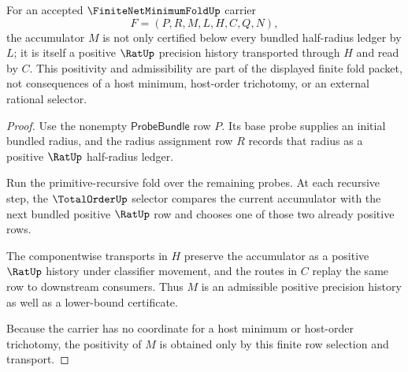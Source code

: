 \begin{theorem}
\label{thm:finite-net-minimum-fold-positive-precision-obligation}
For an accepted $\FiniteNetMinimumFoldUp$ carrier
$$
F=(P,R,M,L,H,C,Q,N),
$$
the accumulator $M$ is not only certified below every bundled half-radius ledger by $L$; it is itself a positive $\RatUp$ precision history transported through $H$ and read by $C$. This positivity and admissibility are part of the displayed finite fold packet, not consequences of a host minimum, host-order trichotomy, or an external rational selector.
\end{theorem}
\begin{proof}
Use the nonempty $\mathsf{ProbeBundle}$ row $P$. Its base probe supplies an initial bundled radius, and the radius assignment row $R$ records that radius as a positive $\RatUp$ half-radius ledger.

Run the primitive-recursive fold over the remaining probes. At each recursive step, the $\TotalOrderUp$ selector compares the current accumulator with the next bundled positive $\RatUp$ row and chooses one of those two already positive rows.

The componentwise transports in $H$ preserve the accumulator as a positive $\RatUp$ history under classifier movement, and the routes in $C$ replay the same row to downstream consumers. Thus $M$ is an admissible positive precision history as well as a lower-bound certificate.

Because the carrier has no coordinate for a host minimum or host-order trichotomy, the positivity of $M$ is obtained only by this finite row selection and transport.
\end{proof}

